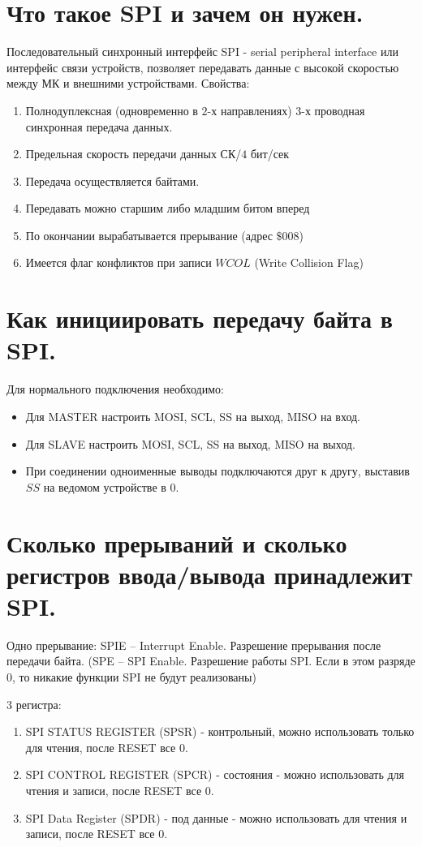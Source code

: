 \section{Что такое SPI и зачем он нужен.}

Последовательный синхронный интерфейс SPI - serial peripheral interface или интерфейс связи
устройств, позволяет передавать данные с высокой скоростью между МК и внешними устройствами.
Свойства:
\begin{enumerate}
  \item Полнодуплексная (одновременно в $2$-х направлениях) $3$-х проводная синхронная
        передача данных. 
  \item Предельная скорость передачи данных СК/$4$ бит/сек 
  \item Передача осуществляется байтами.
  \item Передавать можно старшим либо младшим битом вперед  
  \item По окончании вырабатывается прерывание (адрес $\$008$) 
  \item Имеется флаг конфликтов при записи $WCOL$ (Write Collision Flag) 
\end{enumerate}	

\section{Как инициировать передачу байта в SPI.}

Для нормального подключения необходимо:
\begin{itemize}
  \item Для MASTER настроить MOSI, SCL, SS на выход, MISO на вход.
  \item Для SLAVE настроить MOSI, SCL, SS на выход, MISO на выход.
  \item При соединении одноименные выводы подключаются друг к другу, выставив $SS$ на ведомом 
        устройстве в $0$. 
\end{itemize}

\section{Сколько прерываний и сколько регистров ввода/вывода принадлежит SPI.}

Одно прерывание: SPIE – Interrupt Enable. Разрешение прерывания после передачи байта. 
(SPE – SPI Enable. Разрешение работы SPI. Если в этом разряде $0$, то никакие функции SPI 
не будут реализованы)

3 регистра: 
\begin{enumerate}
  \item SPI STATUS REGISTER (SPSR) - контрольный, можно использовать только для чтения,
        после RESET все $0$. 
  \item SPI CONTROL REGISTER (SPCR) - состояния - можно использовать для чтения и записи,
        после RESET все $0$.
  \item SPI Data Register (SPDR) - под данные - можно использовать для чтения и записи,
        после RESET все $0$. 
\end{enumerate}

